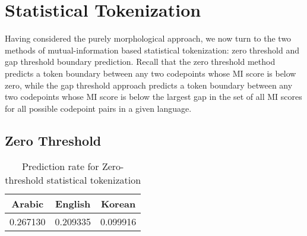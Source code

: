 \FloatBarrier
\section{Statistical Tokenization}

Having considered the purely morphological approach, we now turn to the two methods of mutual-information based statistical tokenization: zero threshold and gap threshold boundary prediction. Recall that the zero threshold method predicts a token boundary between any two codepoints whose MI score is below zero, while the gap threshold approach predicts a token boundary between any two codepoints whose MI score is below the largest gap in the set of all MI scores for all possible codepoint pairs in a given language.

\subsection{Zero Threshold}
\FloatBarrier

\begin{table}
	\centering
	\begin{tabular}{| c | c | c |}
		\hline
		Arabic & English & Korean \\ \hline
		0.267130 & 0.209335 & 0.099916 \\ \hline
	\end{tabular}
	\caption{Prediction rate for Zero-threshold statistical tokenization}
	\label{zpredtable}
\end{table}

